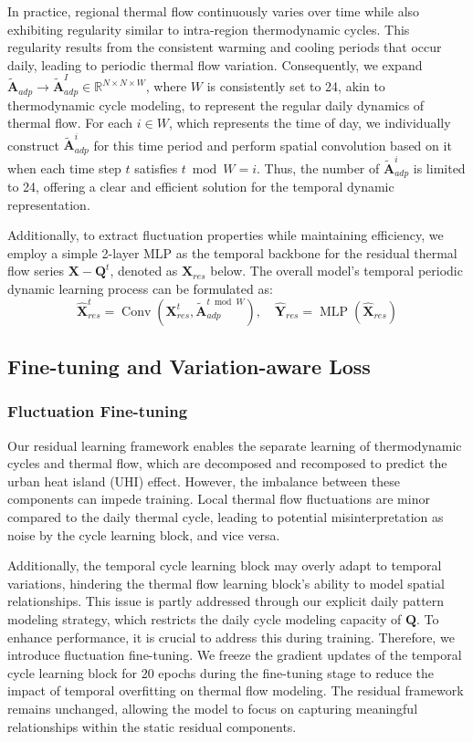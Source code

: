In practice, regional thermal flow continuously varies over time while also exhibiting regularity similar to intra-region thermodynamic cycles. This regularity results from the consistent warming and cooling periods that occur daily, leading to periodic thermal flow variation. Consequently, we expand $\tilde{\mathbf{A}}_{a d p}\rightarrow\tilde{\mathbf{A}}^{I}_{a d p} \in \mathbb{R}^{N \times N \times W}$, where $W$ is consistently set to 24, akin to thermodynamic cycle modeling, to represent the regular daily dynamics of thermal flow. For each $i \in W$, which represents the time of day, we individually construct $\tilde{\mathbf{A}}_{a d p}^{i}$ for this time period and perform spatial convolution based on it when each time step $t$ satisfies $t \bmod W = i$. Thus, the number of $\tilde{\mathbf{A}}_{a d p}^{i}$ is limited to 24, offering a clear and efficient solution for the temporal dynamic representation.

Additionally, to extract fluctuation properties while maintaining efficiency, we employ a simple 2-layer MLP as the temporal backbone for the residual thermal flow series ${\textbf{X} - \textbf{Q}^{t}}$, denoted as $\textbf{X}_{res}$ below. The overall model's temporal periodic dynamic learning process can be formulated as:
\begin{equation}
\hat{\textbf{X}}_{res}^{t} = \operatorname{Conv}(\textbf{X}^{t}_{res}, \tilde{\mathbf{A}}_{a d p}^{t \bmod W}),\quad \hat{\textbf{Y}}_{res} = \operatorname{MLP}(\hat{\textbf{X}}_{res})
\end{equation}

\subsection{Fine-tuning and Variation-aware Loss}
\subsubsection{Fluctuation Fine-tuning}
Our residual learning framework enables the separate learning of thermodynamic cycles and thermal flow, which are decomposed and recomposed to predict the urban heat island (UHI) effect. However, the imbalance between these components can impede training. Local thermal flow fluctuations are minor compared to the daily thermal cycle, leading to potential misinterpretation as noise by the cycle learning block, and vice versa.

Additionally, the temporal cycle learning block may overly adapt to temporal variations, hindering the thermal flow learning block's ability to model spatial relationships. This issue is partly addressed through our explicit daily pattern modeling strategy, which restricts the daily cycle modeling capacity of $\mathbf{Q}$. To enhance performance,     it is crucial to address this during training.
Therefore, we introduce fluctuation fine-tuning. We freeze the gradient updates of the temporal cycle learning block for 20 epochs during the fine-tuning stage to reduce the impact of temporal overfitting on thermal flow modeling. The residual framework remains unchanged, allowing the model to focus on capturing meaningful relationships within the static residual components.

